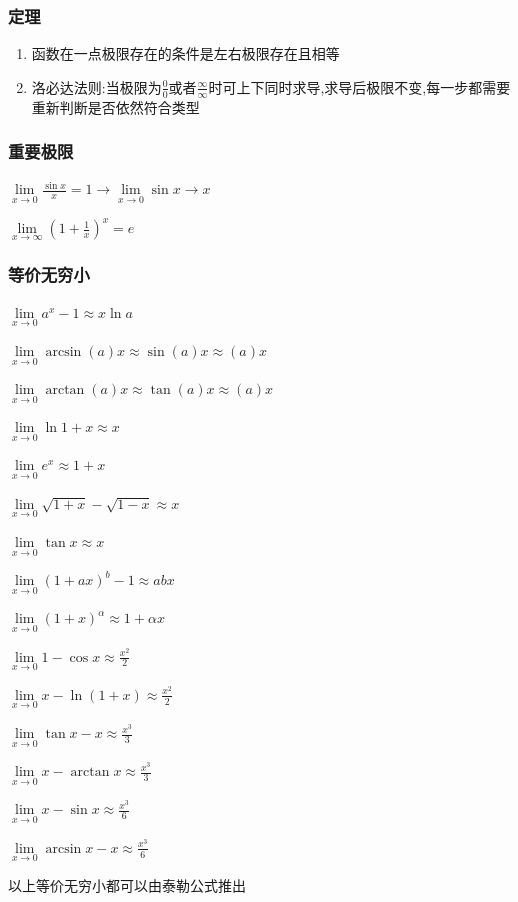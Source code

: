 \documentclass[UTF8]{ctexbook}
\newcommand{\limNormal}[1]{\lim\limits_{#1}}
\newcommand{\myLimToZero}{\limNormal{x \to 0}}
\newcommand{\myLimToInf}{\limNormal{x \to \infty}}
\begin{document}
{{{  \subsubsection{定理}{
    \begin{enumerate}
      \item 函数在一点极限存在的条件是左右极限存在且相等
      \item 洛必达法则:当极限为$\frac{0}{0}$或者$\frac{\infty}{\infty}$时可上下同时求导,求导后极限不变,每一步都需要重新判断是否依然符合类型
    \end{enumerate}
  }%

  \subsubsection{重要极限}{
    $\myLimToZero\frac{\sin{x}}{x}=1 \to \limNormal{x \to 0}\sin{x} \to x$

    $\myLimToInf(1+\frac{1}{x})^x = e$
  }%

  \subsubsection{等价无穷小}{
    $\myLimToZero a^x - 1 \approx x\ln{a}$

    $\myLimToZero \arcsin(a)x \approx \sin(a)x \approx (a)x$

    $\myLimToZero \arctan(a)x \approx \tan(a)x \approx (a)x$

    $\myLimToZero \ln1+x \approx x$

    $\myLimToZero e^x \approx 1+x$

    $\myLimToZero \sqrt{1 + x} - \sqrt{1 - x} \approx x$

    $\myLimToZero \tan{x} \approx x$

    $\myLimToZero (1 + ax)^b - 1 \approx abx$

    $\myLimToZero (1+x)^\alpha \approx 1+\alpha x$

    $\myLimToZero 1 - \cos x \approx \frac{x^2}{2}$

    $\myLimToZero x - \ln(1 + x) \approx \frac{x^2}{2}$

    $\myLimToZero \tan x - x \approx \frac{x^3}{3}$

    $\myLimToZero x - \arctan x \approx \frac{x^3}{3}$

    $\myLimToZero x - \sin x \approx \frac{x^3}{6}$

    $\myLimToZero \arcsin x - x \approx \frac{x^3}{6}$

    以上等价无穷小都可以由泰勒公式推出
  }%

}}}
\end{document}
